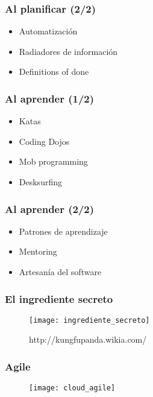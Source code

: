 \begin{frame}
  \frametitle{Al planificar (2/2)}
  \begin{itemize}
    \item Automatización
    \item Radiadores de información
    \item Definitions of done
  \end{itemize}
\end{frame}

\begin{frame}
  \frametitle{Al aprender (1/2)}
  \begin{itemize}
    \item Katas
    \item Coding Dojos
    \item Mob programming
    \item Desksurfing
  \end{itemize}
\end{frame}

\begin{frame}
  \frametitle{Al aprender (2/2)}
  \begin{itemize}
    \item Patrones de aprendizaje
    \item Mentoring
    \item Artesanía del software
  \end{itemize}
\end{frame}

\begin{frame}
  \frametitle{El ingrediente secreto}
  \begin{figure}[ht]
    \centering
    \texttt{[image: ingrediente\_secreto]}
    \caption{http://kungfupanda.wikia.com/}
  \end{figure}
\end{frame}

\begin{frame}
  \frametitle{Agile}
  \begin{figure}[ht]
    \texttt{[image: cloud\_agile]}
  \end{figure}
\end{frame}
